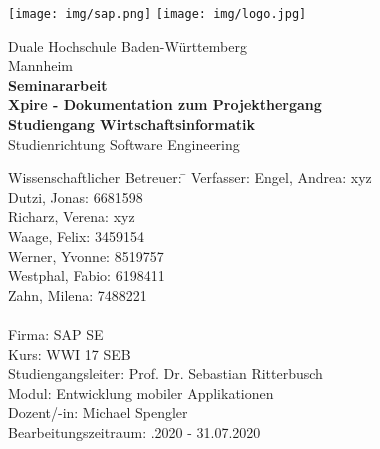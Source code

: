 \begin{titlepage}
\begin{minipage}{\textwidth}
		\vspace{-2cm}
		\noindent \texttt{[image: img/sap.png]} \hfill   \texttt{[image: img/logo.jpg]}
\end{minipage}
\vspace{1em}
\sffamily
\begin{center}
	\textsf{\large{}Duale Hochschule Baden-W\"urttemberg\\[1.5mm] Mannheim}\\[2em]
	\textsf{\textbf{Seminararbeit}}\\[8mm]
	\textsf{\textbf{\Large{}Xpire - Dokumentation zum Projekthergang}} \\[1.5cm]
	\textsf{\textbf{\Large{}Studiengang Wirtschaftsinformatik}\\[3mm] \textsf{Studienrichtung Software Engineering}}
	
	\vspace{3em}
\vfill

\begin{minipage}{\textwidth}

\begin{tabbing}
	Wissenschaftlicher Betreuer: \hspace{0.85cm}\=\kill
	Verfasser: 
		\> Engel, Andrea: xyz \\
		\> Dutzi, Jonas: 6681598 \\
		\> Richarz, Verena: xyz \\
		\> Waage, Felix: 3459154 \\
		\> Werner, Yvonne: 8519757 \\
		\> Westphal, Fabio: 6198411 \\
		\> Zahn, Milena: 7488221 \\\\
	Firma: \> SAP SE \\[1.5mm]
	Kurs: \> WWI 17 SEB\\[1.5mm]
	Studiengangsleiter: \> Prof. Dr. Sebastian Ritterbusch  \\[1.5mm]
	Modul: \> Entwicklung mobiler Applikationen \\[1.5mm]
	Dozent/-in: \> Michael Spengler \\[1.5mm]
	Bearbeitungszeitraum: .2020 - 31.07.2020
	
\end{tabbing}
\end{minipage}

\end{center}

\end{titlepage}